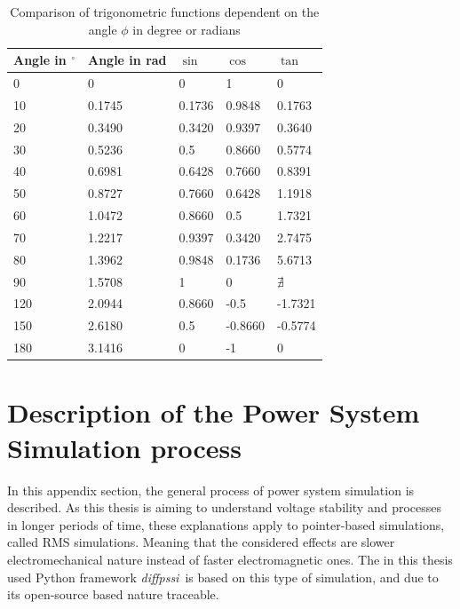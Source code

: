 \begin{table}[H]
    \centering
    \small
    \caption{Comparison of trigonometric functions dependent on the angle $\phi$ in degree or radians}
    \label{tab:trigonometric-func}
    \vspace*{12pt}
    \begin{tabularx}{\linewidth}{XXXXX}
        \textbf{Angle in $^\circ$} & \textbf{Angle in rad} & \textbf{$\sin$} & \textbf{$\cos$} & \textbf{$\tan$} \\ \toprule
        0   & 0         & 0         & 1         & 0 \\
        10  & 0.1745    & 0.1736    & 0.9848    & 0.1763 \\
        20  & 0.3490    & 0.3420    & 0.9397    & 0.3640 \\
        30  & 0.5236    & 0.5       & 0.8660    & 0.5774 \\
        40  & 0.6981    & 0.6428    & 0.7660    & 0.8391 \\
        50  & 0.8727    & 0.7660    & 0.6428    & 1.1918 \\ 
        60  & 1.0472    & 0.8660    & 0.5       & 1.7321 \\
        70  & 1.2217    & 0.9397    & 0.3420    & 2.7475 \\
        80  & 1.3962    & 0.9848    & 0.1736    & 5.6713 \\
        90  & 1.5708    & 1         & 0         & $\nexists$ \\
        120 & 2.0944    & 0.8660    & -0.5      & -1.7321 \\
        150 & 2.6180    & 0.5       & -0.8660   & -0.5774 \\
        180 & 3.1416    & 0         & -1        & 0 \\
        \bottomrule
    \end{tabularx}
\end{table}

\section{Description of the Power System Simulation process}
\label{app:power-system-modeling}

In this appendix section, the general process of power system simulation is described. As this thesis is aiming to understand voltage stability and processes in longer periods of time, these explanations apply to pointer-based simulations, called RMS simulations. Meaning that the considered effects are slower electromechanical nature instead of faster electromagnetic ones. The in this thesis used Python framework \glqq \textit{diffpssi}\grqq~is based on this type of simulation, and due to its open-source based nature traceable.

